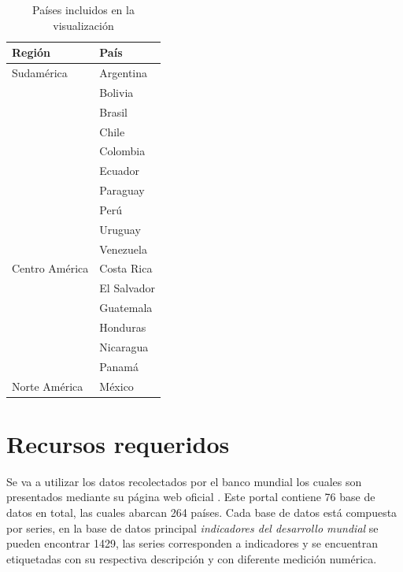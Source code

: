 \documentclass{article}
\begin{document}
\begin{table}[H]
\centering
\caption{Países incluidos en la visualización }
\begin{tabular}{|l|l|}
\hline
\textbf{Región}                 & \textbf{País} \\ \hline
Sudamérica   & Argentina     \\ \cline{2-2} 
                                & Bolivia       \\ \cline{2-2} 
                                & Brasil        \\ \cline{2-2} 
                                & Chile         \\ \cline{2-2} 
                                & Colombia      \\ \cline{2-2} 
                                & Ecuador       \\ \cline{2-2} 
                                & Paraguay      \\ \cline{2-2} 
                                & Perú          \\ \cline{2-2} 
                                & Uruguay       \\ \cline{2-2} 
                                & Venezuela     \\ \hline
Centro América & Costa Rica    \\ \cline{2-2} 
                                & El Salvador   \\ \cline{2-2} 
                                & Guatemala     \\ \cline{2-2} 
                                & Honduras      \\ \cline{2-2} 
                                & Nicaragua     \\ \cline{2-2} 
                                & Panamá        \\ \hline
Norte América                   & México        \\ \hline
\end{tabular}
\end{table}

\section{Recursos requeridos}

Se va a utilizar los datos recolectados por el banco mundial los cuales son presentados mediante su página web oficial \cite{noauthor_indicadores_nodate}. Este portal contiene 76 base de datos en total, las cuales abarcan 264 países. Cada base de datos está compuesta por series, en la base de datos principal \textit{indicadores del desarrollo mundial} se pueden encontrar 1429, las series corresponden a indicadores y se encuentran etiquetadas con su respectiva descripción y con diferente medición numérica.
\end{document}
